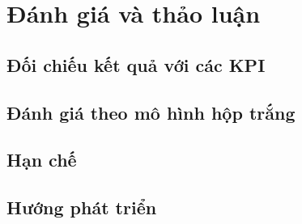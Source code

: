 
\chapter{Đánh giá và thảo luận}
\label{ch:danh-gia}

\section{Đối chiếu kết quả với các KPI}
\label{sec:doi-chieu-kpi}

\section{Đánh giá theo mô hình hộp trắng}
\label{sec:hop-trang}

\section{Hạn chế}
\label{sec:han-che}

\section{Hướng phát triển}
\label{sec:huong-phat-trien}
